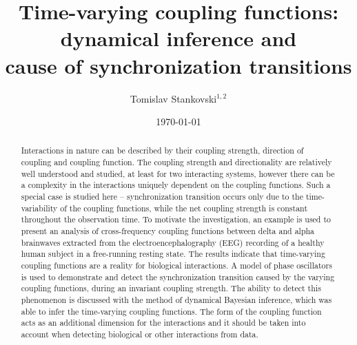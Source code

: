 \documentclass[pre,aps,twocolumn,showpacs]{revtex4}
\begin{document}
\title{Time-varying coupling functions: dynamical inference and\\ cause of synchronization transitions}


\author{Tomislav Stankovski$^{1,2}$}%
%




\begin{abstract}
Interactions in nature can be described by their coupling strength, direction of coupling and coupling function. The coupling strength and directionality are relatively  well understood and studied, at least for two interacting systems, however there can be a complexity in the interactions uniquely dependent on the coupling functions. Such a special case is studied here -- synchronization transition occurs only due to the time-variability of the coupling functions, while the net coupling strength is constant throughout the observation time. To motivate the investigation, an example is used to present an analysis of cross-frequency coupling functions between delta and alpha brainwaves extracted from the electroencephalography (EEG) recording of a healthy human subject in a free-running resting state. The results indicate that  time-varying coupling functions are a reality for biological interactions. A model of phase oscillators is used to demonstrate and detect the synchronization transition caused by the varying coupling functions, during an invariant coupling strength. The ability to detect this phenomenon is discussed with the method of dynamical Bayesian inference, which was able to infer the time-varying coupling functions. The form of the coupling function acts as an additional dimension for the interactions and it should be taken into account when detecting biological or other interactions from data.

\end{abstract}



\date{\today}


\maketitle
\end{document}
